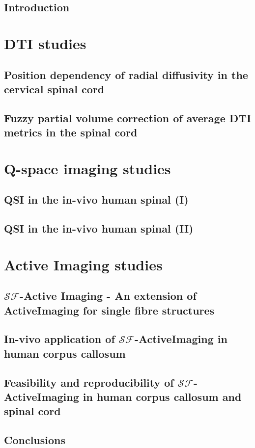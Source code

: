 \documentclass[a4paper,final]{book}
\newcommand{\SF}{{\ensuremath{\mathcal{SF}}}}
\begin{document}
\setcounter{tocdepth}{1}
\tableofcontents

\chapter{Introduction}

\part{DTI studies}
\label{part1}
%
\chapter[Position dependency of radial diffusivity]{Position dependency of radial diffusivity in the cervical spinal cord}
\chapter[Fuzzy partial volume correction]{Fuzzy partial volume correction of average DTI metrics in the spinal cord}
\label{chapter4}
\part{Q-space imaging studies}
\label{part2}

\chapter{QSI in the in-vivo human spinal (I) }
\label{chapter5}
\chapter{QSI in the in-vivo human spinal (II) }
\label{chapter6}
\part{Active Imaging studies}
\label{part3}
\chapter{\SF-Active Imaging - An extension of ActiveImaging for single fibre structures}
\label{chapter7}
\chapter{In-vivo application of {\SF}-ActiveImaging in human corpus callosum}
\label{chapter8}
%
\chapter{Feasibility and reproducibility of {\SF}-ActiveImaging in human corpus callosum and spinal cord}
\label{chapter9}
%
\chapter{Conclusions}


%


\end{document}
